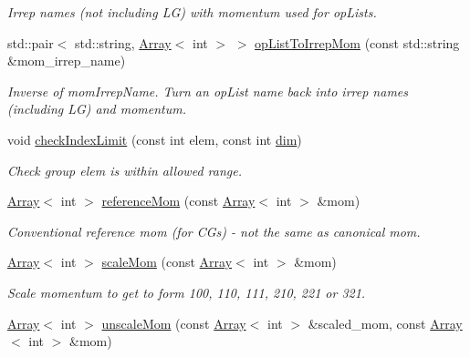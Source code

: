 \begin{DoxyCompactItemize}
\begin{DoxyCompactList}\small\item\em Irrep names (not including LG) with momentum used for op\+Lists. \end{DoxyCompactList}\item 
std\+::pair$<$ std\+::string, \mbox{\hyperlink{classXMLArray_1_1Array}{Array}}$<$ int $>$ $>$ \mbox{\hyperlink{namespaceHadron_a8bd515c92e3dbbe8e9741b25d71edc60}{op\+List\+To\+Irrep\+Mom}} (const std\+::string \&mom\+\_\+irrep\+\_\+name)
\begin{DoxyCompactList}\small\item\em Inverse of mom\+Irrep\+Name. Turn an op\+List name back into irrep names (including LG) and momentum. \end{DoxyCompactList}\item 
void \mbox{\hyperlink{namespaceHadron_a32841ac341a167a00453d3846a386fd9}{check\+Index\+Limit}} (const int elem, const int \mbox{\hyperlink{adat__devel_2lib_2hadron_2irrep__util_8cc_a70b5e28b5bc3d1b63a7435c5fe50b837}{dim}})
\begin{DoxyCompactList}\small\item\em Check group elem is within allowed range. \end{DoxyCompactList}\item 
\mbox{\hyperlink{classXMLArray_1_1Array}{Array}}$<$ int $>$ \mbox{\hyperlink{namespaceHadron_a8a4e39ac150585731d18fb970ec8a1bd}{reference\+Mom}} (const \mbox{\hyperlink{classXMLArray_1_1Array}{Array}}$<$ int $>$ \&mom)
\begin{DoxyCompactList}\small\item\em Conventional reference mom (for C\+Gs) -\/ not the same as canonical mom. \end{DoxyCompactList}\item 
\mbox{\hyperlink{classXMLArray_1_1Array}{Array}}$<$ int $>$ \mbox{\hyperlink{namespaceHadron_ab3424b316e2a4d8e820c88f8027742e1}{scale\+Mom}} (const \mbox{\hyperlink{classXMLArray_1_1Array}{Array}}$<$ int $>$ \&mom)
\begin{DoxyCompactList}\small\item\em Scale momentum to get to form 100, 110, 111, 210, 221 or 321. \end{DoxyCompactList}\item 
\mbox{\hyperlink{classXMLArray_1_1Array}{Array}}$<$ int $>$ \mbox{\hyperlink{namespaceHadron_ad5e2b22f66d2effe70db7f0ba129eae1}{unscale\+Mom}} (const \mbox{\hyperlink{classXMLArray_1_1Array}{Array}}$<$ int $>$ \&scaled\+\_\+mom, const \mbox{\hyperlink{classXMLArray_1_1Array}{Array}}$<$ int $>$ \&mom)

\end{DoxyCompactItemize}
